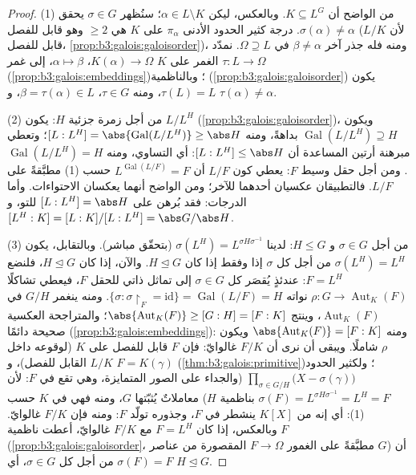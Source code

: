 \begin{proof}
(1) من الواضح أن $K \subseteq L^G$. وبالعكس، ليكن $\alpha \in L
\setminus K$؛ سنُظهر
$\sigma \in G$ يحقق $\sigma(\alpha) \ne
\alpha$. درجة كثير الحدود الأدنى $\pi_\alpha$
على $K$ هي $\geq 2$ وهو قابل للفصل (لأن $L/K$ قابل للفصل،
\cref{prop:b3:galois:galoisorder})، ومنه فله جذر آخر $\beta \neq \alpha$ في  $\Omega \supseteq L$.
نمدّد الغمر على $K$ $K(\alpha) \to \Omega$، $\alpha \mapsto
\beta$، إلى غمر $\tau\colon L \to \Omega$
(\cref{prop:b3:galois:embeddings})؛ وبالناظمية (\cref{prop:b3:galois:galoisorder}) يكون $\tau(L) = L$،
ومنه $\tau \in
G$، $\beta = \tau(\alpha) \in L$، و $\tau(\alpha) \neq
\alpha$.

(2) من أجل زمرة جزئية $H$: يكون $L/L^H$  (\cref{prop:b3:galois:galoisorder})،
ويكون $\operatorname{Gal}(L/L^H) \supseteq H$ بداهةً، ومنه $[L:L^H] =
\abs{\operatorname{Gal}(L/L^H)} \geq \abs H$؛ وتعطي مبرهنة أرتين المساعدة
أن $[L:L^H] \leq \abs H$: أي التساوي، ومنه $\operatorname{Gal}(L/L^H) = H$. ومن أجل حقل وسيط $F$:
يعطي كون $L/F$  أن $L^{\operatorname{Gal}(L/F)} = F$ حسب (1) مطبَّقةً على $L/F$.
فالتطبيقان عكسيان أحدهما للآخر؛ ومن الواضح أنهما يعكسان
الاحتواءات. وأما الدرجات: فقد بُرهن على $[L:L^H] = \abs H$ للتو، و $[L^H:K] = [L:K]/[L:L^H] = \abs G/\abs H$.

(3) من أجل $\sigma \in G$ و $H \leq G$: لدينا $\sigma(L^H) =
L^{\sigma H\sigma^{-1}}$ (بتحقّق
مباشر). وبالتقابل، يكون $\sigma(L^H) = L^H$ من أجل كل $\sigma$ إذا وفقط إذا
كان $H \trianglelefteq G$. والآن، إذا كان $H \trianglelefteq G$، فلنضع $F = L^H$: عندئذٍ
يُقصَر كل $\sigma \in
G$ إلى تماثل ذاتي للحقل $F$، فيعطي تشاكلًا $\rho
\colon G \to \operatorname{Aut}_K(F)$
نواته $\{\sigma :
\sigma\restriction_F = \mathrm{id}\} = \operatorname{Gal}(L/F) =
H$. ومنه ينغمر $G/H$ في $\operatorname{Aut}_K(F)$، وينتج $\abs{\operatorname{Aut}_K(F)} \geq [G:H] = [F:K]$؛
والمتراجحة العكسية صحيحة دائمًا (\cref{prop:b3:galois:embeddings}): ومنه $\abs{\operatorname{Aut}_K(F)} = [F:K]$
ويكون $\rho$ شاملًا. ويبقى أن نرى أن $F/K$ غالوايّ: فإن $F$
قابل للفصل على $K$ (لوقوعه داخل $L/K$ القابل للفصل)، و
$F = K(\gamma)$ (\cref{thm:b3:galois:primitive})؛ ولكثير الحدود $\prod_{\sigma \in G/H}\bigl(X - \sigma(\gamma)\bigr)$ (والجداء
على الصور المتمايزة، وهي تقع في $F$: لأن $\sigma(F) =
L^{\sigma H\sigma^{-1}} = L^H = F$ بناظمية $H$)
معاملاتٌ يُثبّتها $G$، ومنه فهي في $K$ حسب (1): أي إنه  من $K[X]$ ينشطر في $F$، وجذوره تولّد $F$: ومنه فإن
$F/K$ غالوايّ. وبالعكس، إذا كان $F = L^H$ مع $F/K$ غالوايّ،
أعطت ناظمية $F$ (\cref{prop:b3:galois:galoisorder}، مطبَّقةً على الغمور
$F \to \Omega$ المقصورة من عناصر $G$) أن $\sigma(F) = F$ من أجل
كل $\sigma \in G$، أي $H
\trianglelefteq G$.
\end{proof}

